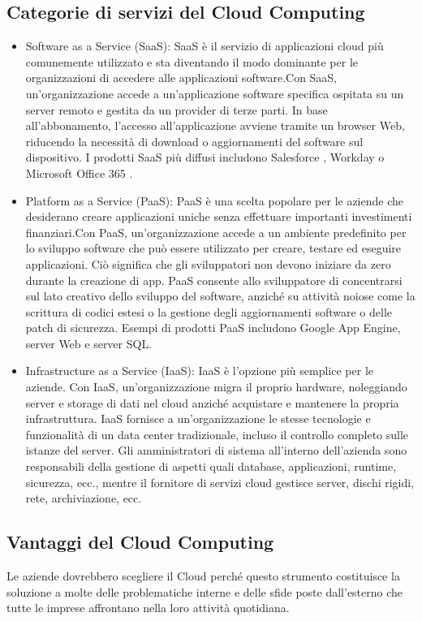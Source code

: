 \subsection{Categorie di servizi del Cloud Computing}
\cite{servizi_cloud}
\begin{itemize}
\item Software as a Service (SaaS): SaaS è il servizio di applicazioni cloud più comunemente utilizzato e sta diventando il modo dominante per le organizzazioni di accedere alle applicazioni software.Con SaaS, un'organizzazione accede a un'applicazione software specifica ospitata su un server remoto e gestita da un provider di terze parti. In base all'abbonamento, l'accesso all'applicazione avviene tramite un browser Web, riducendo la necessità di download o aggiornamenti del software sul dispositivo. I prodotti SaaS più diffusi includono  Salesforce ,  Workday o  Microsoft Office 365 .
\item Platform as a Service (PaaS): PaaS è una scelta popolare per le aziende che desiderano creare applicazioni uniche senza effettuare importanti investimenti finanziari.Con PaaS, un'organizzazione accede a un ambiente predefinito per lo sviluppo software che può essere utilizzato per creare, testare ed eseguire applicazioni. Ciò significa che gli sviluppatori non devono iniziare da zero durante la creazione di app. PaaS consente allo sviluppatore di concentrarsi sul lato creativo dello sviluppo del software, anziché su attività noiose come la scrittura di codici estesi o la gestione degli aggiornamenti software o delle patch di sicurezza. Esempi di prodotti PaaS includono Google App Engine, server Web e server SQL.
\item Infrastructure as a Service (IaaS): IaaS è l'opzione più semplice per le aziende. Con IaaS, un'organizzazione migra il proprio hardware, noleggiando server e storage di dati nel cloud anziché acquistare e mantenere la propria infrastruttura.
IaaS fornisce a un'organizzazione le stesse tecnologie e funzionalità di un data center tradizionale, incluso il controllo completo sulle istanze del server. Gli amministratori di sistema all'interno dell'azienda sono responsabili della gestione di aspetti quali database, applicazioni, runtime, sicurezza, ecc., mentre il fornitore di servizi cloud gestisce server, dischi rigidi, rete, archiviazione, ecc.
\end{itemize}
\subsection{Vantaggi del Cloud Computing}
\cite{vantaggi_cloud}
Le aziende dovrebbero scegliere il Cloud perché questo strumento costituisce la soluzione a molte delle problematiche interne e delle sfide poste dall’esterno che tutte le imprese affrontano nella loro attività quotidiana.

